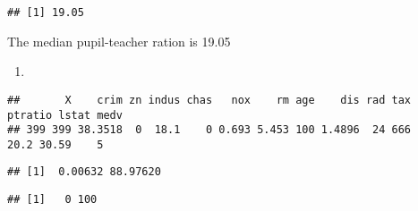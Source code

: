 \documentclass[
]{article}
\newenvironment{Shaded}{\begin{snugshade}}{\end{snugshade}}
\newcommand{\FunctionTok}[1]{\textcolor[rgb]{0.13,0.29,0.53}{\textbf{#1}}}
\newcommand{\NormalTok}[1]{#1}
\newcommand{\OtherTok}[1]{\textcolor[rgb]{0.56,0.35,0.01}{#1}}
\newcommand{\SpecialCharTok}[1]{\textcolor[rgb]{0.81,0.36,0.00}{\textbf{#1}}}
\providecommand{\tightlist}{%
  \setlength{\itemsep}{0pt}\setlength{\parskip}{0pt}}
\begin{document}
\begin{verbatim}
## [1] 19.05
\end{verbatim}

The median pupil-teacher ration is 19.05

\begin{enumerate}
\def\labelenumi{(\alph{enumi})}
\setcounter{enumi}{6}
\tightlist
\item
\end{enumerate}

\begin{Shaded}
\end{Shaded}

\begin{verbatim}
##       X    crim zn indus chas   nox    rm age    dis rad tax ptratio lstat medv
## 399 399 38.3518  0  18.1    0 0.693 5.453 100 1.4896  24 666    20.2 30.59    5
\end{verbatim}

\begin{Shaded}
\end{Shaded}

\begin{verbatim}
## [1]  0.00632 88.97620
\end{verbatim}

\begin{Shaded}
\end{Shaded}

\begin{verbatim}
## [1]   0 100
\end{verbatim}

\begin{Shaded}
\end{Shaded}
\end{document}
